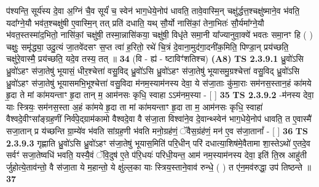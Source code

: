 \documentclass[17pt]{extarticle}
\begin{document}
                  प॑श्यन्ति॒ सूर्य॑स्य दे॒वा अ॒ग्निं चै॒व सूर्यं॑ च॒ स्वेन॑ भाग॒धेये॒नोप॑ धावति॒ तावे॒वास्मि॒न् चक्षु॑र्द्धत्त॒श्चक्षु॑ष्माने॒व भ॑वति॒ यदा᳚ग्ने॒यौ भव॑त॒श्चक्षु॑षी ए॒वास्मि॒न् तत् प्रति॑ दधाति॒ यथ् सौ॒र्यो नासि॑कां॒ तेना॒भितः॑ सौ॒र्यमा᳚ग्ने॒यौ भ॑वत॒स्तस्मा॑द॒भितो॒ नासि॑कां॒ चक्षु॑षी॒ तस्मा॒न्नासि॑कया॒ चक्षु॑षी॒ विधृ॑ते समा॒नी या᳚ज्यानुवा॒क्ये॑ भवतः समा॒नꣳ हि ( ) चक्षुः॒ समृ॑द्ध्या॒ उदु॒त्यं जा॒तवे॑दसꣳ स॒प्त त्वा॑ ह॒रितो॒ रथे॑ चि॒त्रं दे॒वाना॒मुद॑गा॒दनी॑क॒मिति॒ पिण्डा॒न् प्रय॑च्छति॒ चक्षु॑रे॒वास्मै॒ प्रय॑च्छति॒ यदे॒व तस्य॒ तत् ॥ \textbf{  34 } \newline
                  \newline
                      (वि - ह्य॑ - ष्टाविꣳ॑शतिश्च)  \textbf{(A8)} \newline \newline
                                        \textbf{ TS 2.3.9.1} \newline
                  ध्रु॒वो॑ऽसि ध्रु॒वो॑ऽहꣳ स॑जा॒तेषु॑ भूयासं॒ धीर॒श्चेत्ता॑ वसु॒विद् ध्रु॒वो॑ऽसि ध्रु॒वो॑ऽहꣳ स॑जा॒तेषु॑ भूयासमु॒ग्रश्चेत्ता॑ वसु॒विद् ध्रु॒वो॑ऽसि ध्रु॒वो॑ऽहꣳ स॑जा॒तेषु॑ भूयासमभि॒भूश्चेत्ता॑ वसु॒विदा म॑नम॒स्याम॑नस्य देवा॒ ये स॑जा॒ताः कु॑मा॒राः सम॑नस॒स्तान॒हं का॑मये हृ॒दा ते मां का॑मयन्ताꣳ हृ॒दा तान् म॒ आम॑नसः कृधि॒ स्वाहा ऽऽम॑नम॒स्या - [  ] \textbf{  35} \newline
                  \newline
                                \textbf{ TS 2.3.9.2} \newline
                  -म॑नस्य देवा॒ याः स्त्रियः॒ सम॑नस॒स्ता अ॒हं का॑मये हृ॒दा ता मां का॑मयन्ताꣳ हृ॒दा ता म॒ आम॑नसः कृधि॒ स्वाहा॑ वैश्वदे॒वीꣳसा᳚ङ्ग्रह॒णीं निर्व॑पे॒द्ग्राम॑कामो वैश्वदे॒वा वै स॑जा॒ता विश्वा॑ने॒व दे॒वान्थ्स्वेन॑ भाग॒धेये॒नोप॑ धावति॒ त ए॒वास्मै॑ सजा॒तान् प्र य॑च्छन्ति ग्रा॒म्ये॑व भ॑वति सांग्रह॒णी भ॑वति मनो॒ग्रह॑णं॒ ॅवैस॒ग्रंह॑णं॒ मन॑ ए॒व स॑जा॒तानां᳚ - [  ] \textbf{  36} \newline
                  \newline
                                \textbf{ TS 2.3.9.3} \newline
                  गृह्णाति ध्रु॒वो॑ऽसि ध्रु॒वो॑ऽहꣳ स॑जा॒तेषु॑ भूयास॒मिति॑ परि॒धीन् परि॑ दधात्या॒शिष॑मे॒वैतामा शा॒स्तेऽथो॑ ए॒तदे॒व सर्वꣳ॑ सजा॒तेष्वधि॑ भवति॒ यस्यै॒वं ॅवि॒दुष॑ ए॒ते प॑रि॒धयः॑ परिधी॒यन्त॒ आम॑ नम॒स्याम॑नस्य देवा॒ इति॑ ति॒स्र आहु॑ती र्जुहोत्ये॒ताव॑न्तो॒ वै स॑जा॒ता ये म॒हान्तो॒ ये क्षु॑ल्ल॒का याः स्त्रिय॒स्ताने॒वाव॑ रुन्धे॒ ( ) त ए॑न॒मव॑रुद्धा॒ उप॑ तिष्ठन्ते ॥ \textbf{  37} \newline
                  \newline
\end{document}
